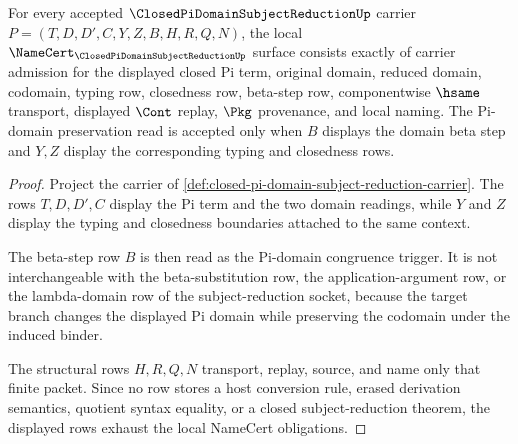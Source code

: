 \begin{theorem}
\label{thm:closed-pi-domain-subject-reduction-obligations}
For every accepted $\ClosedPiDomainSubjectReductionUp$ carrier $P=(T,D,D',C,Y,Z,B,H,R,Q,N)$, the local $\NameCert_{\ClosedPiDomainSubjectReductionUp}$ surface consists exactly of carrier admission for the displayed closed Pi term, original domain, reduced domain, codomain, typing row, closedness row, beta-step row, componentwise $\hsame$ transport, displayed $\Cont$ replay, $\Pkg$ provenance, and local naming. The Pi-domain preservation read is accepted only when $B$ displays the domain beta step and $Y,Z$ display the corresponding typing and closedness rows.
\end{theorem}
\begin{proof}
Project the carrier of \autoref{def:closed-pi-domain-subject-reduction-carrier}. The rows $T,D,D',C$ display the Pi term and the two domain readings, while $Y$ and $Z$ display the typing and closedness boundaries attached to the same context.

The beta-step row $B$ is then read as the Pi-domain congruence trigger. It is not interchangeable with the beta-substitution row, the application-argument row, or the lambda-domain row of the subject-reduction socket, because the target branch changes the displayed Pi domain while preserving the codomain under the induced binder.

The structural rows $H,R,Q,N$ transport, replay, source, and name only that finite packet. Since no row stores a host conversion rule, erased derivation semantics, quotient syntax equality, or a closed subject-reduction theorem, the displayed rows exhaust the local NameCert obligations.
\end{proof}

